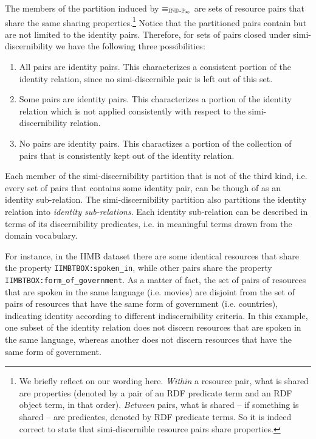 The members of the partition induced by $\equiv_{\operatorname{{\mathbb{IND}-\mathbb{P}}}_{\approx}}$
  are sets of resource pairs that share the same sharing properties.\footnote{
    We briefly reflect on our wording here.
    \emph{Within} a resource pair, what is shared are properties
      (denoted by a pair of an RDF predicate term and an RDF object term,
      in that order).
    \emph{Between} pairs, what is shared -- if something is shared --
      are predicates, denoted by RDF predicate terms.
    So it is indeed correct to state that
      simi-discernible resource pairs share properties.
  }
Notice that the partitioned pairs contain but are not limited to
  the identity pairs.
Therefore, for sets of pairs closed under simi-discernibility
  we have the following three possibilities:
  \begin{enumerate}
    \item All pairs are identity pairs.
          This characterizes a consistent portion of the identity relation,
          since no simi-discernible pair is left out of this set.
    \item Some pairs are identity pairs.
          This characterizes a portion of the identity relation which is not
          applied consistently with respect to
          the simi-discernibility relation.
    \item No pairs are identity pairs.
          This charactizes a portion of the collection of pairs
          that is consistently kept out of the identity relation.
  \end{enumerate}

\noindent Each member of the simi-discernibility partition that is not
  of the third kind, i.e. every set of pairs that contains some identity pair,
  can be though of as an identity sub-relation.
The simi-discernibility partition also partitions the identity relation
  into \emph{identity sub-relations}.
Each identity sub-relation can be described in terms of
  its discernibility predicates,
  i.e. in meaningful terms drawn from the domain vocabulary.

For instance, in the IIMB dataset there are some identical resources that
  share the property {\small \texttt{IIMBTBOX:spoken\_in}},
  while other pairs share the property
  {\small \texttt{IIMBTBOX:form\_of\_government}}.
As a matter of fact, the set of pairs of resources that are spoken in
  the same language (i.e. movies) are disjoint from
  the set of pairs of resources that have the same form of government
  (i.e. countries), indicating identity according to
  different indiscernibility criteria.
In this example, one subset of the identity relation does not discern
  resources that are spoken in the same language,
  whereas another does not discern resources that have
  the same form of government.



